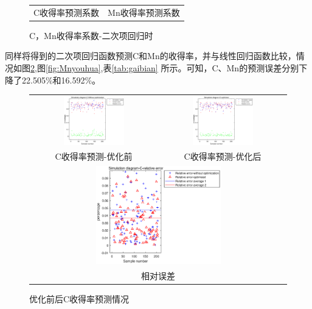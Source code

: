 \documentclass[12pt]{article}%
\begin{document}
\begin{figure}[htbp]
\begin{tabular}{cc}
    C收得率预测系数 & Mn收得率预测系数 \\
  \end{tabular}
  \caption{C，Mn收得率系数-二次项回归时}\label{fig:ercix}
\end{figure}
同样将得到的二次项回归函数预测C和Mn的收得率，并与线性回归函数比较，情况如图\ref{fig:Cyouhua},图\ref{fig:Mnyouhua},表\ref{tab:gaibian}
所示。可知，C、Mn的预测误差分别下降了22.505\%和16.592\%。
\begin{figure}[htbp]
  \centering
  \begin{tabular}{cc}
   \includegraphics[width=0.5\textwidth]{picture/C1}  &\includegraphics[width=0.5\textwidth]{picture/C2}   \\
    C收得率预测-优化前  &  C收得率预测-优化后 \\
    \multicolumn{2}{c}{ \includegraphics[width=0.5\textwidth]{picture/C3}}   \\
     \multicolumn{2}{c}{相对误差}   \\
  \end{tabular}
  \caption{优化前后C收得率预测情况}\label{fig:Cyouhua}
\end{figure}
\end{document}
